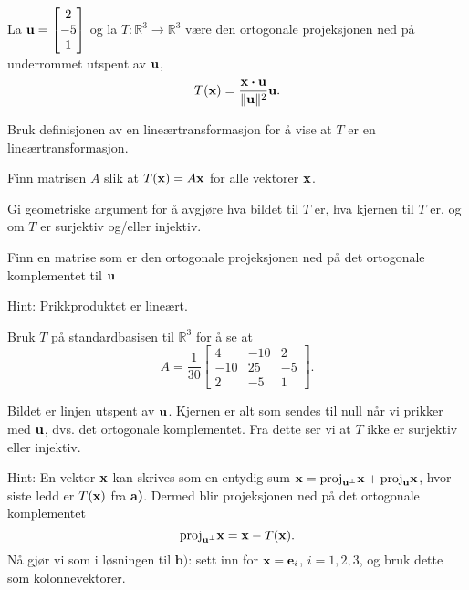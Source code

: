
\begin{oppgave}
La $\mathbf{u}=\begin{bmatrix} 2 \\ -5 \\ 1 \end{bmatrix}$ og la $T:\mathbb{R}^3\rightarrow \mathbb{R}^3$ være den ortogonale projeksjonen ned på underrommet utspent av $\mathbf{u}$,
$$T(\mathbf{x})=\frac{\mathbf{x}\boldsymbol{\cdot} \mathbf{u}}{\|\mathbf{u} \|^2} \mathbf{u}.$$

\begin{punkt}
Bruk definisjonen av en lineærtransformasjon for å vise at $T$ er en lineærtransformasjon.
\end{punkt}

\begin{punkt}
Finn matrisen $A$ slik at $T(\mathbf{x})=A\mathbf{x}$ for alle vektorer $\mathbf{x}$.
\end{punkt}

\begin{punkt}
Gi geometriske argument for å avgjøre hva bildet til $T$ er, hva kjernen til $T$ er, og om $T$ er surjektiv og/eller injektiv.
\end{punkt}


\begin{punkt}
Finn en matrise som er den ortogonale projeksjonen ned på det ortogonale komplementet til $\mathbf{u}$
\end{punkt}


\end{oppgave}

\begin{losning}

\begin{punkt}
Hint: Prikkproduktet er lineært.
\end{punkt}

\begin{punkt}
Bruk $T$ på standardbasisen til $\mathbb{R}^3$ for å se at
$$A=\frac{1}{30}\begin{bmatrix}
4 & -10 & 2\\
-10 & 25 & -5\\
2 & -5 & 1
\end{bmatrix}.$$
\end{punkt}

\begin{punkt}
Bildet er linjen utspent av $\mathbf{u}$. Kjernen er alt som sendes til null når vi prikker med $\mathbf{u}$, dvs. det ortogonale komplementet. Fra dette ser vi at $T$ ikke er surjektiv eller injektiv.
\end{punkt}

\begin{punkt}
Hint: En vektor $\mathbf{x}$ kan skrives som en entydig sum $\mathbf{x}=\text{proj}_{\mathbf{u}^{\perp}}\mathbf{x}+\text{proj}_{\mathbf{u}}\mathbf{x}$, hvor siste ledd er $T(\mathbf{x})$ fra \textbf{a)}. Dermed blir projeksjonen ned på det ortogonale komplementet
$$\text{proj}_{\mathbf{u}^{\perp}}\mathbf{x}=\mathbf{x}-T(\mathbf{x}).$$ Nå gjør vi som i løsningen til $\textbf{b)}$: sett inn for $\mathbf{x}=\mathbf{e}_i$, $i=1,2,3$, og bruk dette som kolonnevektorer.
\end{punkt}

\end{losning}

